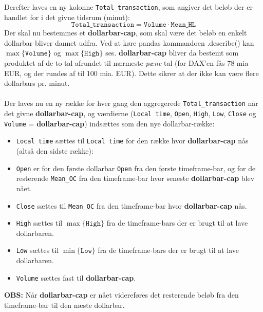\documentclass[a4paper,danish,12pt]{article}
\begin{document}
Derefter laves en ny kolonne \texttt{Total\_transaction}, som angiver det beløb der er handlet for i det givne tidsrum (minut):
\begin{equation*}
\texttt{Total\_transaction} = \texttt{Volume} \cdot \texttt{Mean\_HL}
\end{equation*}
Der skal nu bestemmes et \textbf{dollarbar-cap}, som skal være det beløb en enkelt dollarbar bliver dannet udfra. Ved at køre pandas kommandoen .describe() kan $\max\{ \texttt{Volume} \}$ og $\max\{ \texttt{High} \}$ ses. \textbf{dollarbar-cap} bliver da bestemt som produktet af de to tal afrundet til nærmeste \textit{pæne} tal (for DAX'en fås 78 mia EUR, og der rundes af til 100 mia. EUR). Dette sikrer at der ikke kan være flere dollarbars pr. minut.\\
\\
Der laves nu en ny række for hver gang den aggregerede \texttt{Total\_transaction} når det givne \textbf{dollarbar-cap}, og værdierne (\texttt{Local time}, \texttt{Open}, \texttt{High}, \texttt{Low}, \texttt{Close} og \texttt{Volume} = \textbf{dollarbar-cap}) indsættes som den nye dollarbar-række:
\begin{itemize}
\item \texttt{Local time} sættes til \texttt{Local time} for den række hvor \textbf{dollarbar-cap} nås (altså den sidste række):
\item \texttt{Open} er for den første dollarbar \texttt{Open} fra den første timeframe-bar, og for de resterende \texttt{Mean\_OC} fra den timeframe-bar hvor seneste \textbf{dollarbar-cap} blev nået.
\item \texttt{Close} sættes til \texttt{Mean\_OC} fra den timeframe-bar hvor \textbf{dollarbar-cap} nås.
\item \texttt{High} sættes til $\max\{ \texttt{High} \}$ fra de timeframe-bars der er brugt til at lave dollarbaren.
\item \texttt{Low} sættes til $\min\{ \texttt{Low} \}$ fra de timeframe-bars der er brugt til at lave dollarbaren.
\item \texttt{Volume} sættes fast til \textbf{dollarbar-cap}.
\end{itemize}
\textbf{OBS:} Når \textbf{dollarbar-cap} er nået videreføres det resterende beløb fra den timeframe-bar til den næste dollarbar.
\end{document}
